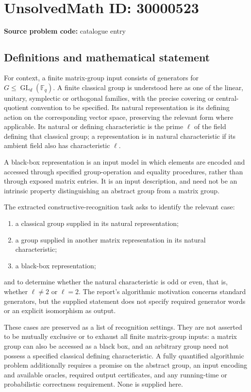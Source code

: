 \documentclass[11pt]{article}
\newcommand{\F}{\mathbb{F}}
\begin{document}
\section*{UnsolvedMath ID: 30000523}
\textbf{Source problem code:} catalogue entry
\subsection{Definitions and mathematical statement}
For context, a finite matrix-group input consists of generators for $G\leq\operatorname{GL}_d(\F_q)$. A finite classical group is understood here as one of the linear, unitary, symplectic or orthogonal families, with the precise covering or central-quotient convention to be specified. Its natural representation is its defining action on the corresponding vector space, preserving the relevant form where applicable. Its natural or defining characteristic is the prime $\ell$ of the field defining that classical group; a representation is in natural characteristic if its ambient field also has characteristic $\ell$.

A black-box representation is an input model in which elements are encoded and accessed through specified group-operation and equality procedures, rather than through exposed matrix entries. It is an input description, and need not be an intrinsic property distinguishing an abstract group from a matrix group.

The extracted constructive-recognition task asks to identify the relevant case:
\begin{enumerate}
\item a classical group supplied in its natural representation;
\item a group supplied in another matrix representation in its natural characteristic;
\item a black-box representation;
\end{enumerate}
and to determine whether the natural characteristic is odd or even, that is, whether $\ell\ne2$ or $\ell=2$. The report's algorithmic motivation concerns standard generators, but the supplied statement does not specify required generator words or an explicit isomorphism as output.

These cases are preserved as a list of recognition settings. They are not asserted to be mutually exclusive or to exhaust all finite matrix-group inputs: a matrix group can also be accessed as a black box, and an arbitrary group need not possess a specified classical defining characteristic. A fully quantified algorithmic problem additionally requires a promise on the abstract group, an input encoding and available oracles, required output certificates, and any running-time or probabilistic correctness requirement. None is supplied here.
\end{document}
